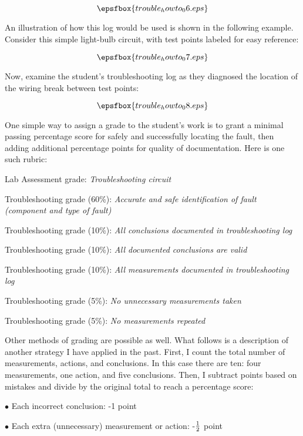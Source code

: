 $$\epsfbox{trouble_howto_06.eps}$$

An illustration of how this log would be used is shown in the following example.  Consider this simple light-bulb circuit, with test points labeled for easy reference:

$$\epsfbox{trouble_howto_07.eps}$$

Now, examine the student's troubleshooting log as they diagnosed the location of the wiring break between test points:

$$\epsfbox{trouble_howto_08.eps}$$

One simple way to assign a grade to the student's work is to grant a minimal passing percentage score for safely and successfully locating the fault, then adding additional percentage points for quality of documentation.  Here is one such rubric:

\vskip 10pt

\hskip 10pt Lab Assessment grade: {\it Troubleshooting circuit}

\hskip 10pt Troubleshooting grade (60\%): {\it Accurate and safe identification of fault (component and type of fault)}

\hskip 10pt Troubleshooting grade (10\%): {\it All conclusions documented in troubleshooting log}
  
\hskip 10pt Troubleshooting grade (10\%): {\it All documented conclusions are valid}
 
\hskip 10pt Troubleshooting grade (10\%): {\it All measurements documented in troubleshooting log}
 
\hskip 10pt Troubleshooting grade (5\%): {\it No unnecessary measurements taken}
 
\hskip 10pt Troubleshooting grade (5\%): {\it No measurements repeated}

\vskip 10pt

Other methods of grading are possible as well.  What follows is a description of another strategy I have applied in the past.  First, I count the total number of measurements, actions, and conclusions.  In this case there are ten: four measurements, one action, and five conclusions.  Then, I subtract points based on mistakes and divide by the original total to reach a percentage score:

\medskip
\item{$\bullet$} Each incorrect conclusion: -1 point
\item{$\bullet$} Each extra (unnecessary) measurement or action: -${1 \over 2}$ point
\medskip

